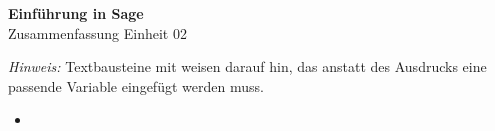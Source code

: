 \documentclass[a4paper,9pt,DIV15,twocolumn]{scrartcl}
\begin{document}
\begin{center}
    \textbf{\LARGE Einf\"uhrung in Sage}\\
    {\large Zusammenfassung Einheit 02}
\end{center}
\textsl{Hinweis:} Textbausteine mit  weisen darauf hin, das anstatt des Ausdrucks eine passende Variable eingefügt werden muss.

\medskip

\begin{itemize}
    \item
\begin{sagein} 
\end{sagein}
\end{itemize}
\end{document}
